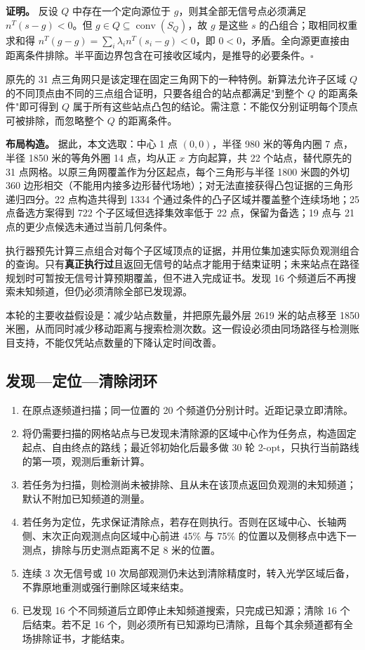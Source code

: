 \textbf{证明。} 反设 $Q$ 中存在一个定向源位于 $g$，则其全部无信号点必须满足 $n^{T}(s-g)<0$。但 $g\in Q\subseteq\operatorname{conv}(S_Q)$，故 $g$ 是这些 $s$ 的凸组合；取相同权重求和得 $n^{T}(g-g)=\sum_i\lambda_in^{T}(s_i-g)<0$，即 $0<0$，矛盾。全向源更直接由距离条件排除。半平面边界包含在可接收区域内，是推导的必要条件。$\square$

原先的 31 点三角网只是该定理在固定三角网下的一种特例。新算法允许子区域 $Q$ 的不同顶点由不同的三点组合证明，只要各组合的站点都满足"到整个 $Q$ 的距离条件"即可得到 $Q$ 属于所有这些站点凸包的结论。需注意：不能仅分别证明每个顶点可被排除，而忽略整个 $Q$ 的距离条件。

\textbf{布局构造。} 据此，本文选取：中心 1 点 $(0,0)$，半径 980 米的等角内圈 7 点，半径 1850 米的等角外圈 14 点，均从正 $x$ 方向起算，共 22 个站点，替代原先的 31 点网格。以原三角网覆盖作为分区起点，每个三角形与半径 1800 米圆的外切 360 边形相交（不能用内接多边形替代场地）；对无法直接获得凸包证据的三角形递归四分。22 点构造共得到 1334 个通过条件的凸子区域并覆盖整个连续场地；25 点备选方案得到 722 个子区域但选择集效率低于 22 点，保留为备选；19 点与 21 点的更少点候选未通过当前几何条件。

执行器预先计算三点组合对每个子区域顶点的证据，并用位集加速实际负观测组合的查询。只有\textbf{真正执行过}且返回无信号的站点才能用于结束证明；未来站点在路径规划时可暂按无信号计算预期覆盖，但不进入完成证书。发现 16 个频道后不再搜索未知频道，但仍必须清除全部已发现源。

本轮的主要收益假设是：减少站点数量，并把原先最外层 2619 米的站点移至 1850 米圈，从而同时减少移动距离与搜索检测次数。这一假设必须由同场路径与检测账目支持，不能仅凭站点数量的下降认定时间改善。

\subsection{发现—定位—清除闭环}

\begin{enumerate}[label=(\arabic*),leftmargin=2.2em]
  \item 在原点逐频道扫描；同一位置的 20 个频道仍分别计时。近距记录立即清除。
  \item 将仍需要扫描的网格站点与已发现未清除源的区域中心作为任务点，构造固定起点、自由终点的路线；最近邻初始化后最多做 30 轮 2-opt，只执行当前路线的第一项，观测后重新计算。
  \item 若任务为扫描，则检测尚未被排除、且从未在该顶点返回负观测的未知频道；默认不附加已知频道的测量。
  \item 若任务为定位，先求保证清除点，若存在则执行。否则在区域中心、长轴两侧、末次正向观测点向区域中心前进 45\% 与 75\% 的位置以及侧移点中选下一测点，排除与历史测点距离不足 8 米的位置。
  \item 连续 3 次无信号或 10 次局部观测仍未达到清除精度时，转入光学区域后备，不靠原地重测或强行删除区域来结束。
  \item 已发现 16 个不同频道后立即停止未知频道搜索，只完成已知源；清除 16 个后结束。若不足 16 个，则必须所有已知源均已清除，且每个其余频道都有全场排除证书，才能结束。
\end{enumerate}

